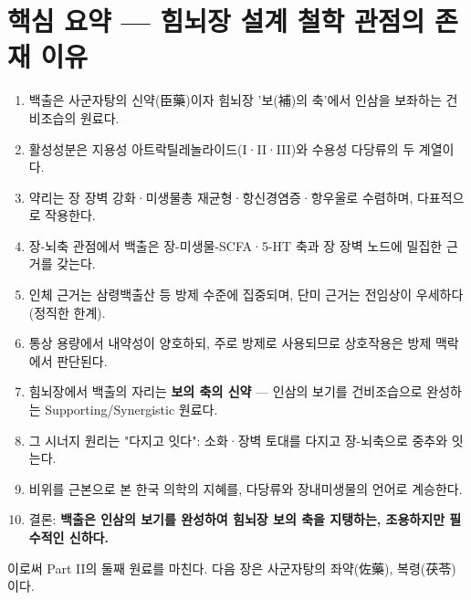 \documentclass[11pt,oneside]{book}
\begin{document}
\section{핵심 요약 — 힘뇌장 설계 철학 관점의 존재 이유}
\begin{enumerate}[leftmargin=6mm,itemsep=1pt,topsep=2pt]
  \item 백출은 사군자탕의 신약(臣藥)이자 힘뇌장 '보(補)의 축'에서 인삼을 보좌하는 건비조습의 원료다.
  \item 활성성분은 지용성 아트락틸레놀라이드(I·II·III)와 수용성 다당류의 두 계열이다.
  \item 약리는 장 장벽 강화·미생물총 재균형·항신경염증·항우울로 수렴하며, 다표적으로 작용한다.
  \item 장-뇌축 관점에서 백출은 장-미생물-SCFA·5-HT 축과 장 장벽 노드에 밀집한 근거를 갖는다.
  \item 인체 근거는 삼령백출산 등 방제 수준에 집중되며, 단미 근거는 전임상이 우세하다(정직한 한계).
  \item 통상 용량에서 내약성이 양호하되, 주로 방제로 사용되므로 상호작용은 방제 맥락에서 판단된다.
  \item 힘뇌장에서 백출의 자리는 \textbf{보의 축의 신약} — 인삼의 보기를 건비조습으로 완성하는 Supporting/Synergistic 원료다.
  \item 그 시너지 원리는 "다지고 잇다": 소화·장벽 토대를 다지고 장-뇌축으로 중추와 잇는다.
  \item 비위를 근본으로 본 한국 의학의 지혜를, 다당류와 장내미생물의 언어로 계승한다.
  \item 결론: \textbf{백출은 인삼의 보기를 완성하여 힘뇌장 보의 축을 지탱하는, 조용하지만 필수적인 신하다.}
\end{enumerate}
이로써 Part II의 둘째 원료를 마친다. 다음 장은 사군자탕의 좌약(佐藥), 복령(茯苓)이다.
\end{document}

